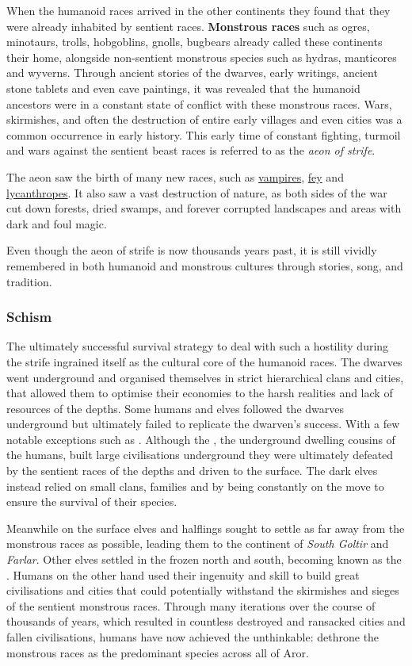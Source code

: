 When the humanoid races arrived in the other continents they found that they
were already inhabited by sentient races. \textbf{Monstrous races} such as
ogres, minotaurs, trolls, hobgoblins, gnolls, bugbears already called these
continents their home, alongside non-sentient monstrous species such as
hydras, manticores and wyverns. Through ancient stories of the dwarves, early
writings, ancient stone tablets and even cave paintings, it was revealed that
the humanoid ancestors were in a constant state of conflict with these
monstrous races. Wars, skirmishes, and often the destruction of entire early
villages and even cities was a common occurrence in early history. This early
time of constant fighting, turmoil and wars against the sentient beast races
is referred to as the \emph{aeon of strife}.

The aeon saw the birth of many new races, such as
\hyperref[sec:Vampires]{vampires}, \hyperref[sec:Fey]{fey} and
\hyperref[sec:Lycanthropes]{lycanthropes}. It also saw a vast destruction of
nature, as both sides of the war cut down forests, dried swamps, and forever
corrupted landscapes and areas with dark and foul magic.

Even though the aeon of strife is now thousands years past, it is still
vividly remembered in both humanoid and monstrous cultures through stories,
song, and tradition.

\subsubsection{Schism}
\label{sec:Schism}

The ultimately successful survival strategy to deal with such a hostility
during the strife ingrained itself as the cultural core of the humanoid
races. The dwarves went underground and organised themselves in strict
hierarchical clans and cities, that allowed them to optimise their economies to
the harsh realities and lack of resources of the depths. Some humans and elves
followed the dwarves underground but ultimately failed to replicate the
dwarven's success. With a few notable exceptions such as .
Although the , the underground dwelling cousins of the
humans, built large civilisations underground they were ultimately defeated by
the sentient races of the depths and driven to the surface. The dark elves
instead relied on small clans, families and by being constantly on the move to
ensure the survival of their species.

Meanwhile on the surface elves and halflings sought to settle as far away from
the monstrous races as possible, leading them to the continent of \emph{South
Goltir} and \emph{Farlar}. Other elves settled in the frozen north and south,
becoming known as the . Humans on the other hand used
their ingenuity and skill to build great civilisations and cities that could
potentially withstand the skirmishes and sieges of the sentient monstrous
races. Through many iterations over the course of thousands of years, which
resulted in countless destroyed and ransacked cities and fallen civilisations,
humans have now achieved the unthinkable: dethrone the monstrous races as the
predominant species across all of Aror.

